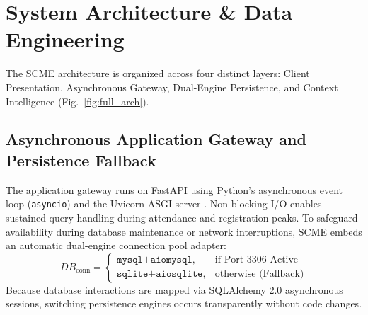 \documentclass[conference]{IEEEtran}
\begin{document}
\section{System Architecture \& Data Engineering}
\label{sec:architecture}

The SCME architecture is organized across four distinct layers: Client Presentation, Asynchronous Gateway, Dual-Engine Persistence, and Context Intelligence (Fig.~\ref{fig:full_arch}).

\subsection{Asynchronous Application Gateway and Persistence Fallback}
The application gateway runs on FastAPI using Python's asynchronous event loop (\texttt{asyncio}) and the Uvicorn ASGI server \cite{fastapiweb, zhao2025asynchronous}. Non-blocking I/O enables sustained query handling during attendance and registration peaks. To safeguard availability during database maintenance or network interruptions, SCME embeds an automatic dual-engine connection pool adapter:
\begin{equation}
DB_{\mathrm{conn}} = \begin{cases} 
\mathtt{mysql\text{+}aiomysql}, & \text{if Port 3306 Active} \\ 
\mathtt{sqlite\text{+}aiosqlite}, & \text{otherwise (Fallback)} 
\end{cases}
\label{eq:fallback}
\end{equation}
Because database interactions are mapped via SQLAlchemy 2.0 asynchronous sessions, switching persistence engines occurs transparently without code changes.
\end{document}
